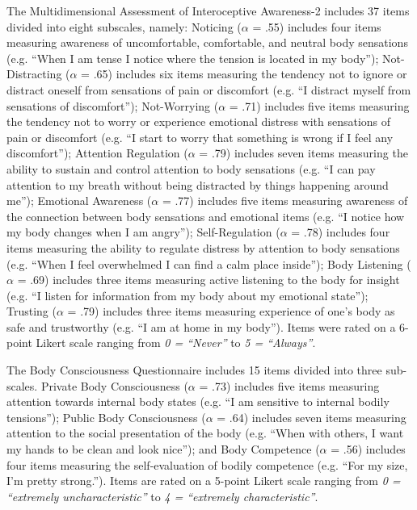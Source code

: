 \documentclass[man]{apa7}
\begin{document}
The Multidimensional Assessment of Interoceptive Awareness-2 \parencite{mehling2018multidimensional} includes 37 items divided into eight subscales, namely: Noticing ($\alpha$ = .55) includes four items measuring awareness of uncomfortable, comfortable, and neutral body sensations (e.g. “When I am tense I notice where the tension is located in my body”); Not-Distracting ($\alpha$ = .65) includes six items measuring the tendency not to ignore or distract oneself from sensations of pain or discomfort (e.g. “I distract myself from sensations of discomfort”); Not-Worrying ($\alpha$ = .71) includes five items measuring the tendency not to worry or experience emotional distress with sensations of pain or discomfort (e.g. “I start to worry that something is wrong if I feel any discomfort”); Attention Regulation ($\alpha$ = .79) includes seven items measuring the ability to sustain and control attention to body sensations (e.g. “I can pay attention to my breath without being distracted by things happening around me”); Emotional Awareness ($\alpha$ = .77) includes five items measuring awareness of the connection between body sensations and emotional items (e.g. “I notice how my body changes when I am angry”); Self-Regulation ($\alpha$ = .78) includes four items measuring the ability to regulate distress by attention to body sensations (e.g. “When I feel overwhelmed I can find a calm place inside”); Body Listening ($\alpha$ = .69) includes three items measuring active listening to the body for insight (e.g. “I listen for information from my body about my emotional state”); Trusting ($\alpha$ = .79) includes three items measuring experience of one’s body as safe and trustworthy  (e.g. “I am at home in my body”). Items were rated on a 6-point Likert scale ranging from \emph{0 = “Never”} to \emph{5 = “Always”}. 

The Body Consciousness Questionnaire \parencite{miller1981consciousness} includes 15 items divided into three sub-scales. Private Body Consciousness ($\alpha$ = .73) includes five items measuring attention towards internal body states (e.g. “I am sensitive to internal bodily tensions”); Public Body Consciousness ($\alpha$ = .64) includes seven items measuring attention to the social presentation of the body (e.g. “When with others, I want my hands to be clean and look nice”); and Body Competence ($\alpha$ = .56) includes four items measuring the self-evaluation of bodily competence (e.g. “For my size, I'm pretty strong.”). Items are rated on a 5-point Likert scale ranging from \emph{0 = “extremely uncharacteristic”} to \emph{4 = “extremely characteristic”}. 
\end{document}
